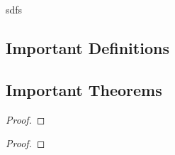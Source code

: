 \documentclass[
10pt, %
a4paper, %
twocolumn, %
landscape %
]{article}
\begin{document}
\vspace{5pt}

\begin{description}
\item sdfs
\end{description}

\vspace{7pt}

\subsection{Important Definitions}

\begin{defn}

\end{defn}

\vspace{5pt}

\begin{defn}

\end{defn}

\vspace{7pt}

\subsection{Important Theorems}

\begin{thm}

\end{thm}

\vspace{5pt}

\begin{proof}

\end{proof}

\vspace{5pt}

\begin{thm}

\end{thm}

\vspace{5pt}

\begin{proof}

\end{proof}

\vspace{7pt}


\end{document}
